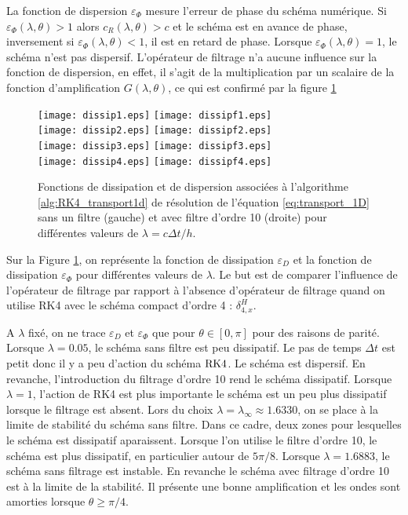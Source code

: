 La fonction de dispersion $\varepsilon_{\Phi}$ mesure l'erreur de phase du schéma numérique. Si $\varepsilon_{\Phi}(\lambda, \theta) > 1$ alors $c_R(\lambda,\theta) > c$ et le schéma est en avance de phase, inversement si $\varepsilon_{\Phi}(\lambda, \theta) < 1$, il est en retard de phase. Lorsque $\varepsilon_{\Phi}(\lambda, \theta) = 1$, le schéma n'est pas dispersif.
L'opérateur de filtrage n'a aucune influence sur la fonction de dispersion, en effet, il s'agit de la multiplication par un scalaire de la fonction d'amplification $G(\lambda,\theta)$, ce qui est confirmé par la figure \ref{fig:dissip_disper}

\begin{figure}[htbp]
\begin{center}
\texttt{[image: dissip1.eps]}
\texttt{[image: dissipf1.eps]}\\
\texttt{[image: dissip2.eps]}
\texttt{[image: dissipf2.eps]}\\
\texttt{[image: dissip3.eps]}
\texttt{[image: dissipf3.eps]}\\
\texttt{[image: dissip4.eps]}
\texttt{[image: dissipf4.eps]}
\end{center}
\caption{Fonctions de dissipation et de dispersion associées à l'algorithme \ref{alg:RK4_transport1d} de résolution de l'équation \eqref{eq:transport_1D} sans un filtre (gauche) et avec filtre d'ordre 10 (droite) pour différentes valeurs de $\lambda = c \Delta t / h$.}
\label{fig:dissip_disper}
\end{figure}

Sur la Figure \ref{fig:dissip_disper}, on représente la fonction de dissipation $\varepsilon_D$ et la fonction de dissipation $\varepsilon_{\Phi}$ pour différentes valeurs de $\lambda$. Le but est de comparer l'influence de l'opérateur de filtrage par rapport à l'absence d'opérateur de filtrage quand on utilise RK4 avec le schéma compact d'ordre 4 : $\delta_{4,x}^H$.

A $\lambda$ fixé, on ne trace $\varepsilon_D$ et $\varepsilon_{\Phi}$ que pour $\theta \in [0, \pi]$ pour des raisons de parité. Lorsque $\lambda=0.05$, le schéma sans filtre est peu dissipatif. Le pas de temps $\Delta t$ est petit donc il y a peu d'action du schéma $\RK4$. Le schéma est dispersif. En revanche, l'introduction du filtrage d'ordre 10 rend le schéma dissipatif. Lorsque $\lambda =1$, l'action de RK4 est plus importante le schéma est un peu plus dissipatif lorsque le filtrage est absent.
Lors du choix $\lambda = \lambda_{\infty} \approx 1.6330$, on se place à la limite de stabilité du schéma sans filtre. Dans ce cadre, deux zones pour lesquelles le schéma est dissipatif aparaissent. Lorsque l'on utilise le filtre d'ordre 10, le schéma est plus dissipatif, en particulier autour de $5 \pi/8$.
Lorsque $\lambda = 1.6883$, le schéma sans filtrage est instable. En revanche le schéma avec filtrage d'ordre 10 est à la limite de la stabilité. Il présente une bonne amplification et les ondes sont amorties lorsque $\theta \geq \pi/4$.







